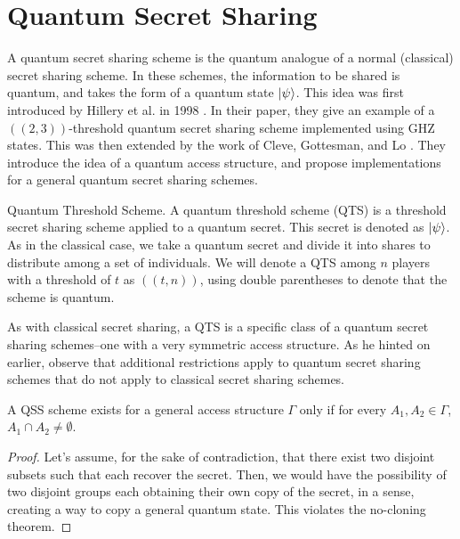 \section{Quantum Secret Sharing}
\label{section:qss}

A quantum secret sharing scheme is the quantum analogue of a normal (classical) secret sharing scheme. In these schemes, the information to be shared is quantum, and takes the form of a quantum state $\ket{\psi}$. This idea was first introduced by Hillery et al. in 1998 \cite{Hillery_1999}. In their paper, they give an example of a $((2,3))$-threshold quantum secret sharing scheme implemented using GHZ states. This was then extended by the work of Cleve, Gottesman, and Lo \cite{Cleve_1999}. They introduce the idea of a quantum access structure, and propose implementations for a general quantum secret sharing schemes.

\begin{definition}{Quantum Threshold Scheme.}
    \label{defn:qts}
    A quantum threshold scheme (QTS) is a threshold secret sharing scheme applied to a quantum secret. This secret is denoted as $\ket{\psi}$. As in the classical case, we take a quantum secret and divide it into shares to distribute among a set of individuals. We will denote a QTS among $n$ players with a threshold of $t$ as $((t,n))$, using double parentheses to denote that the scheme is quantum.
\end{definition}

As with classical secret sharing, a QTS is a specific class of a quantum secret sharing schemes--one with a very symmetric access structure. As he hinted on earlier, observe that additional restrictions apply to quantum secret sharing schemes that do not apply to classical secret sharing schemes.

\begin{theorem}
    \label{thm:qss-disjoint}
    A QSS scheme exists for a general access structure $\Gamma$ only if for every $A_1, A_2 \in \Gamma$, $A_1 \cap A_2 \neq \emptyset$.
\end{theorem}

\begin{proof}
    Let's assume, for the sake of contradiction, that there exist two disjoint subsets such that each recover the secret. Then, we would have the possibility of two disjoint groups each obtaining their own copy of the secret, in a sense, creating a way to copy a general quantum state. This violates the no-cloning theorem.
\end{proof}

